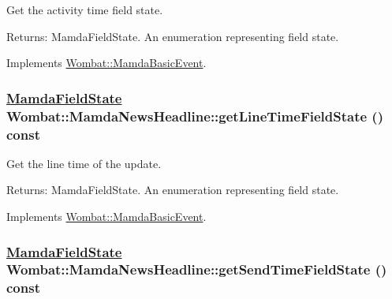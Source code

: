 Get the activity time field state. 

\begin{Desc}
\item[Returns:]Mamda\-Field\-State. An enumeration representing field state. \end{Desc}


Implements \hyperlink{classWombat_1_1MamdaBasicEvent_a61a566e3442181ca1fadc4524296cd0}{Wombat::Mamda\-Basic\-Event}.\hypertarget{classWombat_1_1MamdaNewsHeadline_c89f8f0d4d435a3c4b168a54d6b550be}{
\subsubsection[getLineTimeFieldState]{\setlength{\rightskip}{0pt plus 5cm}\hyperlink{namespaceWombat_93aac974f2ab713554fd12a1fa3b7d2a}{Mamda\-Field\-State} Wombat::Mamda\-News\-Headline::get\-Line\-Time\-Field\-State () const}}
\label{classWombat_1_1MamdaNewsHeadline_c89f8f0d4d435a3c4b168a54d6b550be}


Get the line time of the update. 

\begin{Desc}
\item[Returns:]Mamda\-Field\-State. An enumeration representing field state. \end{Desc}


Implements \hyperlink{classWombat_1_1MamdaBasicEvent_eb06352aca3280c5e89bad7a3b185cdf}{Wombat::Mamda\-Basic\-Event}.\hypertarget{classWombat_1_1MamdaNewsHeadline_fc1ffb1b9bcb412afe19dee561bac49f}{
\subsubsection[getSendTimeFieldState]{\setlength{\rightskip}{0pt plus 5cm}\hyperlink{namespaceWombat_93aac974f2ab713554fd12a1fa3b7d2a}{Mamda\-Field\-State} Wombat::Mamda\-News\-Headline::get\-Send\-Time\-Field\-State () const}}
\label{classWombat_1_1MamdaNewsHeadline_fc1ffb1b9bcb412afe19dee561bac49f}


